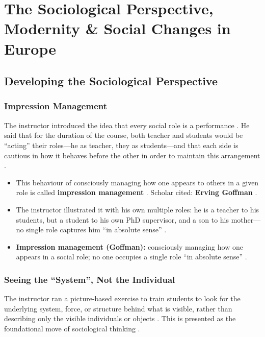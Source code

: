 
\chapter{The Sociological Perspective, Modernity \& Social Changes in Europe}

\section{Developing the Sociological Perspective}

\subsection{Impression Management}
The instructor introduced the idea that every social role is a performance . He said that for the duration of the course, both teacher and students would be ``acting'' their roles---he as teacher, they as students---and that each side is cautious in how it behaves before the other in order to maintain this arrangement .

\begin{KeyConcept}
\begin{itemize}
    \item This behaviour of consciously managing how one appears to others in a given role is called \textbf{impression management} . Scholar cited: \textbf{Erving Goffman} .
    \item The instructor illustrated it with his own multiple roles: he is a teacher to his students, but a student to his own PhD supervisor, and a son to his mother---no single role captures him ``in absolute sense'' .
\end{itemize}
\end{KeyConcept}

\begin{QuickRevision}
\begin{itemize}
    \item \textbf{Impression management (Goffman):} consciously managing how one appears in a social role; no one occupies a single role ``in absolute sense'' .
\end{itemize}
\end{QuickRevision}

\subsection{Seeing the ``System'', Not the Individual}
The instructor ran a picture-based exercise to train students to look for the underlying system, force, or structure behind what is visible, rather than describing only the visible individuals or objects . This is presented as the foundational move of sociological thinking .

